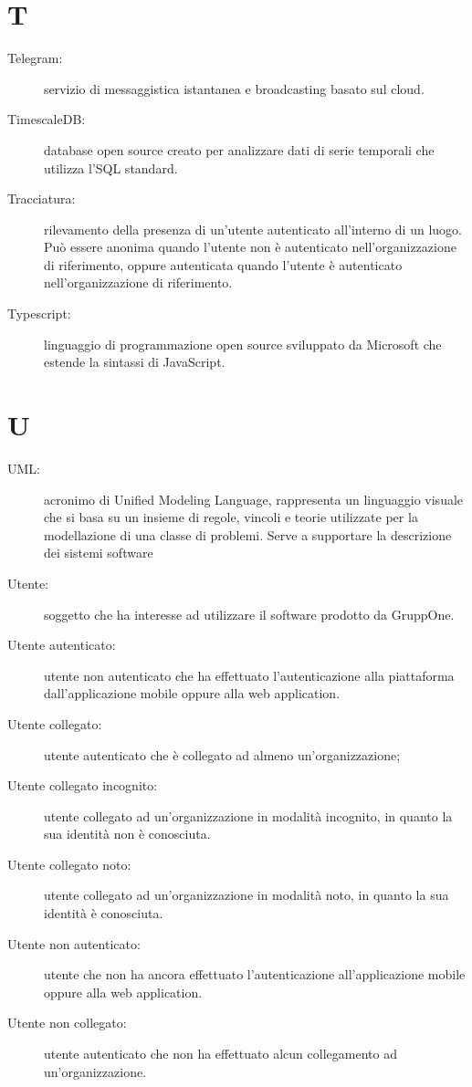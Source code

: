 \documentclass{article}
\begin{document}
	\section{T}
	\begin{description}
		\item[Telegram:] servizio di messaggistica istantanea e broadcasting basato sul cloud.
		\item[TimescaleDB:] database open source creato per analizzare dati di serie temporali che utilizza l'SQL standard.
		\item[Tracciatura:] rilevamento della presenza di un'utente autenticato all’interno di un luogo. Può essere anonima quando l'utente non è autenticato nell’organizzazione di riferimento, oppure autenticata quando l'utente è autenticato nell’organizzazione di riferimento.
		\item[Typescript:] linguaggio di programmazione open source sviluppato da Microsoft che estende la sintassi di JavaScript.
	\end{description}
	\newpage
	\section{U}
	\begin{description}
		\item[UML:] acronimo di Unified Modeling Language, rappresenta un linguaggio visuale che si basa su un insieme di regole, vincoli e teorie utilizzate per la modellazione di una classe di problemi. Serve a supportare la descrizione dei sistemi software
		\item[Utente:] soggetto che ha interesse ad utilizzare il software prodotto da GruppOne.
		\item[Utente autenticato:] utente non autenticato che ha effettuato l'autenticazione alla piattaforma dall'applicazione mobile oppure alla web application.
		\item[Utente collegato:] utente autenticato che è collegato ad almeno un'organizzazione;
		\item[Utente collegato incognito:] utente collegato ad un'organizzazione in modalità incognito, in quanto la sua identità non è conosciuta.
		\item[Utente collegato noto:] utente collegato ad un'organizzazione in modalità noto, in quanto la sua identità è conosciuta.
		\item[Utente non autenticato:] utente che non ha ancora effettuato l'autenticazione all'applicazione mobile oppure alla web application.
		\item[Utente non collegato:] utente autenticato che non ha effettuato alcun collegamento ad un'organizzazione.
	\end{description}
	\newpage
\end{document}
